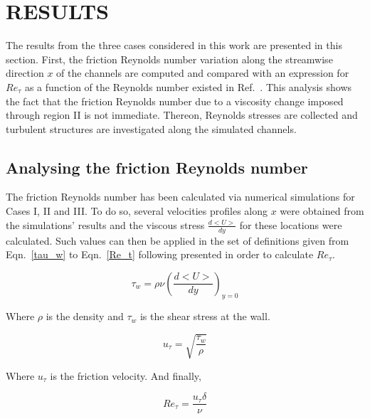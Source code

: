 \documentclass[twocolumn,10pt]{asme2e}
\begin{document}

\section*{RESULTS}

The results from the three cases considered in this work are presented in this section. First, the friction Reynolds number variation along the streamwise direction \(x\) of the channels are computed and compared with an expression for \(Re_{\tau}\) as a function of the Reynolds number existed in Ref.~\cite{pope}. This analysis shows the fact that the friction Reynolds number due to a viscosity change imposed through region II is not immediate. Thereon, Reynolds stresses are collected and turbulent structures are investigated along the simulated channels.


\subsection*{Analysing the friction Reynolds number}

The friction Reynolds number has been calculated via numerical simulations for Cases I, II and III. To do so, several velocities profiles along \(x\) were obtained from the simulations' results and the viscous stress \(\frac{d<U>}{dy}\) for these locations were calculated. Such values can then be applied in the set of definitions given from Eqn.~\ref{tau_w} to Eqn.~\ref{Re_t} following presented in order to calculate \(Re_{\tau}\).

\begin{equation}
{\tau}_w = \rho\nu\left(\frac{d<U>}{dy}\right)_{y=0}
\label{tau_w}
\end{equation}

Where \(\rho\) is the density and \({\tau}_w\)  is the shear stress at the wall.

\begin{equation}
u_{\tau} = \sqrt{\frac{{\tau}_w}{\rho}}
\label{u_t}
\end{equation}

Where \(u_{\tau}\) is the friction velocity. And finally,

\begin{equation}
Re_{\tau} = \frac{u_{\tau}\delta}{\nu}
\label{Re_t}
\end{equation}
\end{document}
